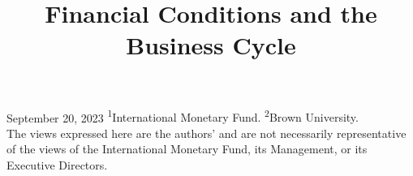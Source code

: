 \documentclass[12pt,xcolor={dvipsnames},hyperref={pdftex,pdfpagemode=UseNone,hidelinks,pdfdisplaydoctitle=true},usepdftitle=false]{beamer}
\begin{document}
\title{Financial Conditions and the Business Cycle}
{September 20, 2023}
{}
{\textsuperscript{1}International Monetary Fund. \textsuperscript{2}Brown University.\\\vspace{0.2cm}The views expressed here are the authors’ and are not necessarily representative of the views of the International Monetary Fund, its Management, or its Executive Directors.}

\frame[plain]{\titlepage}











\appendix


\end{document}
